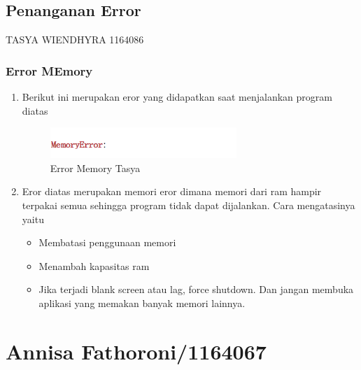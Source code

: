 \subsection{Penanganan Error}
 TASYA WIENDHYRA 1164086
\subsubsection{Error MEmory}
\begin{enumerate}
	\item
Berikut ini merupakan eror yang didapatkan saat menjalankan program diatas
\begin{figure}[ht]
\centering
\includegraphics[scale=0.5]{figures/chapter5tasya31.jpg}
\caption{Error Memory Tasya }
\label{Error}
\end{figure}
\item Eror diatas merupakan memori eror dimana memori dari ram hampir terpakai semua sehingga program tidak dapat dijalankan. Cara mengatasinya yaitu
\begin{itemize}
\item Membatasi penggunaan memori
\item Menambah kapasitas ram
\item Jika terjadi blank screen atau lag, force shutdown. Dan jangan membuka aplikasi yang memakan banyak memori lainnya.
\end{itemize}
\end{enumerate}


\section{Annisa Fathoroni/1164067}

